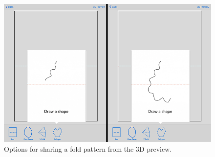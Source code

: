 \begin{figure}[htbp]
\centering
\includegraphics{figures/32_UI_Tool_Interactions/tutorial_step_one_two.png}
\caption{Options for sharing a fold pattern from the 3D preview.}
\end{figure}
